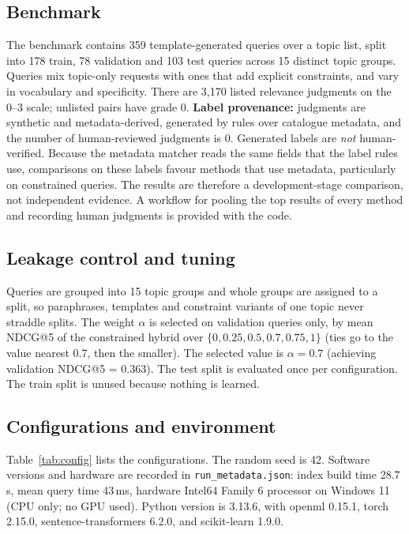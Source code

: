 \documentclass[conference]{IEEEtran}
\begin{document}
\subsection{Benchmark}
The benchmark contains 359 template-generated queries over a topic list, split into 178 train, 78 validation and 103 test queries across 15 distinct topic groups. Queries mix topic-only requests with ones that add explicit constraints, and vary in vocabulary and specificity. There are 3,170 listed relevance judgments on the 0--3 scale; unlisted pairs have grade 0. \textbf{Label provenance:} judgments are synthetic and metadata-derived, generated by rules over catalogue metadata, and the number of human-reviewed judgments is 0. Generated labels are \emph{not} human-verified. Because the metadata matcher reads the same fields that the label rules use, comparisons on these labels favour methods that use metadata, particularly on constrained queries. The results are therefore a development-stage comparison, not independent evidence. A workflow for pooling the top results of every method and recording human judgments is provided with the code.

\subsection{Leakage control and tuning}
Queries are grouped into 15 topic groups and whole groups are assigned to a split, so paraphrases, templates and constraint variants of one topic never straddle splits. The weight $\alpha$ is selected on validation queries only, by mean NDCG@5 of the constrained hybrid over $\{0, 0.25, 0.5, 0.7, 0.75, 1\}$ (ties go to the value nearest 0.7, then the smaller). The selected value is $\alpha=0.7$ (achieving validation NDCG@5 = 0.363). The test split is evaluated once per configuration. The train split is unused because nothing is learned.

\subsection{Configurations and environment}
Table~\ref{tab:config} lists the configurations. The random seed is 42. Software versions and hardware are recorded in \texttt{run\_metadata.json}: index build time 28.7\,s, mean query time 43\,ms, hardware Intel64 Family 6 processor on Windows 11 (CPU only; no GPU used). Python version is 3.13.6, with openml 0.15.1, torch 2.15.0, sentence-transformers 6.2.0, and scikit-learn 1.9.0.
\end{document}
